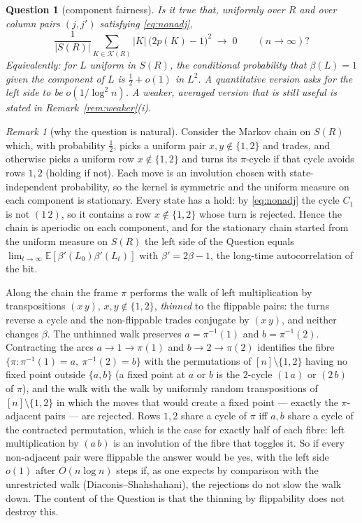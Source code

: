 \documentclass[11pt]{amsart}
\newtheorem{question}{Question}
\theoremstyle{remark}
\newtheorem{remark}{Remark}
\newcommand{\E}{\mathbb{E}}
\begin{document}
\begin{question}[component fairness]
Is it true that, uniformly over $R$ and over column pairs $(j,j')$
satisfying \eqref{eq:nonadj},
\[
\frac1{|S(R)|}\sum_{K\in\mathcal K(R)}|K|\,\bigl(2p(K)-1\bigr)^2
\;\longrightarrow\;0\qquad(n\to\infty)?
\]
Equivalently: for $L$ uniform in $S(R)$, the conditional probability
that $\beta(L)=1$ given the component of $L$ is $\tfrac12+o(1)$ in
$L^2$.  A quantitative version asks for the left side to be
$o(1/\log^2n)$.  A weaker, averaged version that is still useful is
stated in Remark~\ref{rem:weaker}(i).
\end{question}

\begin{remark}[why the question is natural]\label{rem:natural}
Consider the Markov chain on $S(R)$ which, with probability
$\tfrac12$, picks a uniform pair $x,y\notin\{1,2\}$ and trades, and
otherwise picks a uniform row $x\notin\{1,2\}$ and turns its
$\pi$-cycle if that cycle avoids rows $1,2$ (holding if not).  Each
move is an involution chosen with state-independent probability, so
the kernel is symmetric and the uniform measure on each component is
stationary.  Every state has a hold: by \eqref{eq:nonadj} the cycle
$C_1$ is not $(1\,2)$, so it contains a row $x\notin\{1,2\}$ whose
turn is rejected.  Hence the chain is aperiodic on each component, and
for the stationary chain started from the uniform measure on $S(R)$
the left side of the Question equals
$\lim_{t\to\infty}\E[\beta'(L_0)\beta'(L_t)]$ with $\beta'=2\beta-1$,
the long-time autocorrelation of the bit.

Along the chain the frame $\pi$ performs the walk of left
multiplication by transpositions $(x\,y)$, $x,y\notin\{1,2\}$,
\emph{thinned} to the flippable pairs: the turns reverse a cycle and
the non-flippable trades conjugate by $(x\,y)$, and neither changes
$\beta$.  The unthinned walk preserves $a=\pi^{-1}(1)$ and
$b=\pi^{-1}(2)$.  Contracting the arcs $a\to1\to\pi(1)$ and
$b\to2\to\pi(2)$ identifies the fibre
$\{\pi:\pi^{-1}(1)=a,\ \pi^{-1}(2)=b\}$ with the permutations of
$[n]\setminus\{1,2\}$ having no fixed point outside $\{a,b\}$ (a fixed
point at $a$ or $b$ is the $2$-cycle $(1\,a)$ or $(2\,b)$ of $\pi$),
and the walk with the walk by uniformly random transpositions of
$[n]\setminus\{1,2\}$ in which the moves that would create a fixed
point --- exactly the $\pi$-adjacent pairs --- are rejected.  Rows
$1,2$ share a cycle of $\pi$ iff $a,b$ share a cycle of the contracted
permutation, which is the case for exactly half of each fibre: left
multiplication by $(a\,b)$ is an involution of the fibre that
toggles it.  So if every non-adjacent pair were flippable the answer
would be yes, with the left side $o(1)$ after $O(n\log n)$ steps if,
as one expects by comparison with the unrestricted walk
(Diaconis--Shahshahani), the rejections do not slow the walk down.
The content of the Question is that the thinning by flippability does
not destroy this.
\end{remark}
\end{document}
